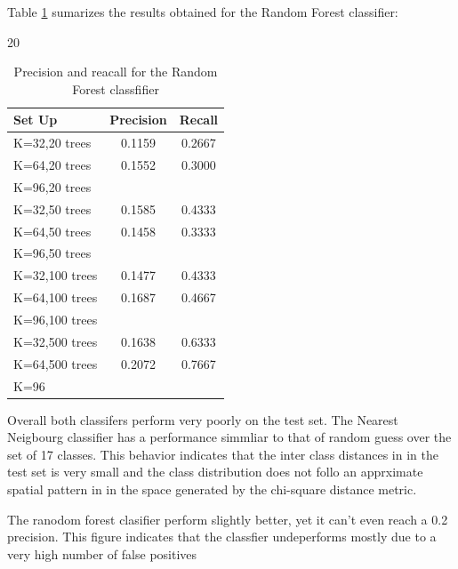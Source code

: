 \documentclass[a4paper]{article}
\begin{document}
Table \ref{table:table2}  sumarizes the results obtained for the Random Forest classifier:

20
\begin{table}[t]
\centering
\begin{tabular}{ l | c | c}
Set Up & Precision & Recall   \\
\hline	
K=32,20 trees & 0.1159 & 0.2667 \\
K=64,20 trees & 0.1552 & 0.3000 \\
K=96,20 trees &  &  \\
K=32,50 trees & 0.1585 & 0.4333 \\
K=64,50 trees & 0.1458 & 0.3333 \\
K=96,50 trees &  &  \\
K=32,100 trees & 0.1477 & 0.4333  \\
K=64,100 trees & 0.1687 & 0.4667  \\
K=96,100 trees &  &  \\
K=32,500 trees & 0.1638 & 0.6333  \\
K=64,500 trees & 0.2072  &  0.7667 \\
K=96 &  &   \\

\end{tabular}
\caption{Precision and reacall for the Random Forest classfifier}
\label{table:table2}
\end{table}


Overall both classifers perform very poorly on the test set. The Nearest Neigbourg classifier has a performance simmliar to that of random guess over the set of 17 classes. This behavior indicates that the inter class distances in in the test set is very small and the class distribution does not follo an apprximate spatial pattern in in the space generated by the chi-square distance metric. 

The ranodom forest clasifier perform slightly better, yet it can't even reach a 0.2 precision. This figure indicates that the classfier undeperforms mostly due to a very high number of false positives 









\end{document}
